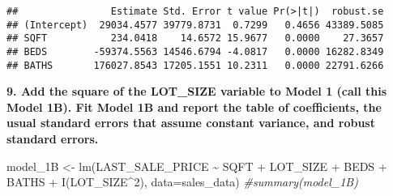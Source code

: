 \documentclass[
]{article}
\newenvironment{Shaded}{\begin{snugshade}}{\end{snugshade}}
\newcommand{\AttributeTok}[1]{\textcolor[rgb]{0.77,0.63,0.00}{#1}}
\newcommand{\CommentTok}[1]{\textcolor[rgb]{0.56,0.35,0.01}{\textit{#1}}}
\newcommand{\DecValTok}[1]{\textcolor[rgb]{0.00,0.00,0.81}{#1}}
\newcommand{\FunctionTok}[1]{\textcolor[rgb]{0.00,0.00,0.00}{#1}}
\newcommand{\NormalTok}[1]{#1}
\newcommand{\OtherTok}[1]{\textcolor[rgb]{0.56,0.35,0.01}{#1}}
\newcommand{\SpecialCharTok}[1]{\textcolor[rgb]{0.00,0.00,0.00}{#1}}
\begin{document}
\begin{Shaded}
\end{Shaded}

\begin{verbatim}
##                Estimate Std. Error t value Pr(>|t|)  robust.se
## (Intercept)  29034.4577 39779.8731  0.7299   0.4656 43389.5085
## SQFT           234.0418    14.6572 15.9677   0.0000    27.3657
## BEDS        -59374.5563 14546.6794 -4.0817   0.0000 16282.8349
## BATHS       176027.8543 17205.1551 10.2311   0.0000 22791.6266
\end{verbatim}

\textbf{9. Add the square of the LOT\_SIZE variable to Model 1 (call
this Model 1B). Fit Model 1B and report the table of coefficients, the
usual standard errors that assume constant variance, and robust standard
errors.}

\begin{Shaded}
\begin{Highlighting}[]
\NormalTok{model\_1B }\OtherTok{\textless{}{-}} \FunctionTok{lm}\NormalTok{(LAST\_SALE\_PRICE }\SpecialCharTok{\textasciitilde{}}\NormalTok{ SQFT }\SpecialCharTok{+}\NormalTok{ LOT\_SIZE }\SpecialCharTok{+}\NormalTok{ BEDS }\SpecialCharTok{+}\NormalTok{ BATHS }\SpecialCharTok{+} \FunctionTok{I}\NormalTok{(LOT\_SIZE}\SpecialCharTok{\^{}}\DecValTok{2}\NormalTok{), }\AttributeTok{data=}\NormalTok{sales\_data)}
\CommentTok{\#summary(model\_1B)}
\end{Highlighting}
\end{Shaded}

\begin{Shaded}
\end{Shaded}
\end{document}
